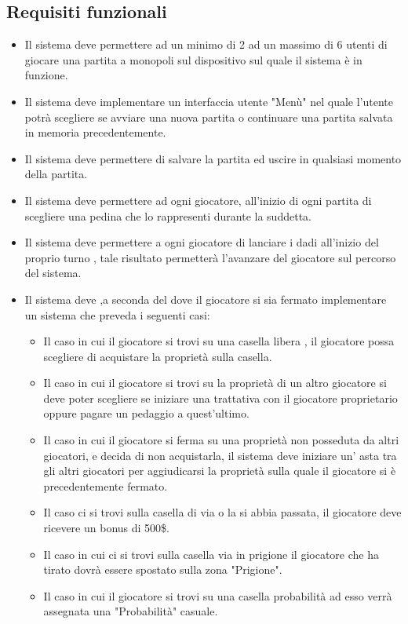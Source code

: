 \documentclass[a4paper]{article}
\begin{document}
\subsection{Requisiti funzionali}
\begin{itemize}
\item Il sistema deve permettere  ad un minimo di 2 ad un massimo di 6 utenti di giocare una partita a monopoli sul dispositivo sul quale  il sistema è in funzione.
\item Il sistema deve implementare un interfaccia utente  "Menù" nel quale l'utente potrà scegliere se avviare una nuova partita o continuare una partita salvata in memoria precedentemente.
\item Il sistema deve permettere di salvare la partita ed uscire in qualsiasi momento della partita.
\item Il sistema deve permettere ad ogni giocatore, all'inizio di ogni partita di scegliere una pedina che lo rappresenti durante la suddetta.
\item Il sistema deve permettere a ogni giocatore di lanciare i dadi all'inizio del proprio turno , tale risultato permetterà l'avanzare del giocatore sul percorso del sistema.
\item Il sistema deve ,a seconda del dove il giocatore si sia fermato implementare un sistema che preveda i seguenti casi:
\begin{itemize}
\item Il caso in cui il giocatore si  trovi su una casella  libera , il giocatore possa scegliere di acquistare la proprietà sulla casella.
\item Il caso  in cui il giocatore si  trovi su  la proprietà di un altro giocatore si deve poter scegliere se iniziare una trattativa con il giocatore proprietario oppure pagare un pedaggio a quest'ultimo.
\item Il caso in cui il giocatore si ferma su una  proprietà non posseduta da altri giocatori, e decida di non acquistarla, il sistema deve iniziare un’ asta tra gli altri giocatori per aggiudicarsi la proprietà sulla quale il giocatore si è precedentemente fermato.
\item Il caso ci si trovi sulla casella di via o la si abbia passata, il giocatore deve ricevere un bonus di 500\$.
\item Il caso in cui ci si trovi sulla casella via in prigione il  giocatore che ha tirato dovrà essere spostato sulla zona "Prigione".
\item Il caso in cui  il giocatore si trovi su una casella probabilità ad esso verrà assegnata una "Probabilità" casuale.

\end{itemize}
\end{itemize}
\end{document}
